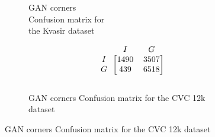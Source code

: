 \begin{figure}[h]
\begin{subfigure}[b]{0.49\textwidth}
        
\caption{GAN corners\\ Confusion matrix for \\the Kvasir dataset}
\label{mat:kvasir_CM_IRV2_GAN_CORNER}
\end{subfigure}
\begin{subfigure}[b]{0.25\textwidth}
        \[
\begin{blockarray}{ccc}
& I & G  \\
\begin{block}{c[cc]}
 		I&1490 & 3507\\
        G&439  & 6518\\
\end{block}
\end{blockarray}
\]   
\caption{GAN corners Confusion matrix for the CVC 12k dataset}
\label{mat:cvc12k_CM_IRV2_GAN_CORNER}
\end{subfigure}

\vspace{1cm}


\end{figure}
